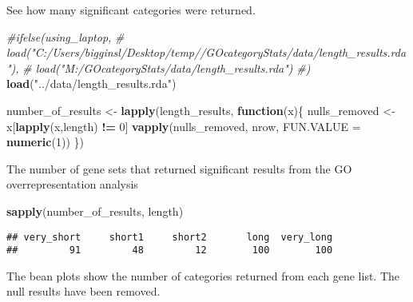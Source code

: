 \documentclass[]{article}
\newenvironment{Shaded}{\begin{snugshade}}{\end{snugshade}}
\newcommand{\KeywordTok}[1]{\textcolor[rgb]{0.13,0.29,0.53}{\textbf{#1}}}
\newcommand{\DataTypeTok}[1]{\textcolor[rgb]{0.13,0.29,0.53}{#1}}
\newcommand{\DecValTok}[1]{\textcolor[rgb]{0.00,0.00,0.81}{#1}}
\newcommand{\StringTok}[1]{\textcolor[rgb]{0.31,0.60,0.02}{#1}}
\newcommand{\CommentTok}[1]{\textcolor[rgb]{0.56,0.35,0.01}{\textit{#1}}}
\newcommand{\ControlFlowTok}[1]{\textcolor[rgb]{0.13,0.29,0.53}{\textbf{#1}}}
\newcommand{\OperatorTok}[1]{\textcolor[rgb]{0.81,0.36,0.00}{\textbf{#1}}}
\newcommand{\NormalTok}[1]{#1}
\begin{document}
See how many significant categories were returned.

\begin{Shaded}
\begin{Highlighting}[]
\CommentTok{#ifelse(using_laptop,}
\CommentTok{#       load("C:/Users/bigginsl/Desktop/temp//GOcategoryStats/data/length_results.rda"),}
\CommentTok{#       load("M:/GOcategoryStats/data/length_results.rda")}
\CommentTok{#)}
\KeywordTok{load}\NormalTok{(}\StringTok{"../data/length_results.rda"}\NormalTok{)}

\NormalTok{number_of_results <-}\StringTok{ }\KeywordTok{lapply}\NormalTok{(length_results, }\ControlFlowTok{function}\NormalTok{(x)\{}
\NormalTok{  nulls_removed <-}\StringTok{ }\NormalTok{x[}\KeywordTok{lapply}\NormalTok{(x,length) }\OperatorTok{!=}\StringTok{ }\DecValTok{0}\NormalTok{]}
  \KeywordTok{vapply}\NormalTok{(nulls_removed, nrow, }\DataTypeTok{FUN.VALUE =} \KeywordTok{numeric}\NormalTok{(}\DecValTok{1}\NormalTok{))}
\NormalTok{\})  }
\end{Highlighting}
\end{Shaded}

The number of gene sets that returned significant results from the GO
overrepresentation analysis

\begin{Shaded}
\begin{Highlighting}[]
\KeywordTok{sapply}\NormalTok{(number_of_results, length)}
\end{Highlighting}
\end{Shaded}

\begin{verbatim}
## very_short     short1     short2       long  very_long 
##         91         48         12        100        100
\end{verbatim}

The bean plots show the number of categories returned from each gene
list. The null results have been removed.
\end{document}
